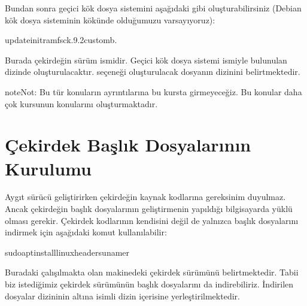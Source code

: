 \documentclass[a4paper,10pt,turkish]{sphinxmanual}
\begin{document}
\sphinxAtStartPar
Bundan sonra geçici kök dosya sistemini aşağıdaki gibi oluşturabilirsiniz (Debian kök dosya sisteminin
kökünde olduğumuzu varsayıyoruz):

\begin{sphinxVerbatim}[commandchars=\\\{\}]
\PYGZdl{}update\PYGZhy{}initramfs\PYGZhy{}c\PYGZhy{}k.9.2\PYGZhy{}custom\PYGZhy{}b.
\end{sphinxVerbatim}

\sphinxAtStartPar
Burada  çekirdeğin sürüm ismidir. Geçici kök dosya sistemi 
ismiyle bulunulan dizinde oluşturulacaktır.  seçeneği oluşturulacak dosyanın dizinini
belirtmektedir.

\begin{sphinxadmonition}{note}{Not:}
\sphinxAtStartPar
Bu tür konuların ayrıntılarına bu kursta girmeyeceğiz. Bu konular daha çok  kursunun konularını oluşturmaktadır.
\end{sphinxadmonition}


\section{Çekirdek Başlık Dosyalarının Kurulumu}
\label{\detokenize{kernelcompilation:cekirdek-baslik-dosyalarinin-kurulumu}}
\sphinxAtStartPar
Aygıt sürücü geliştirirken çekirdeğin kaynak kodlarına gereksinim duyulmaz. Ancak çekirdeğin başlık
dosyalarının geliştirmenin yapıldığı bilgisayarda yüklü olması gerekir. Çekirdek kodlarının kendisini
değil de yalnızca başlık dosyalarını indirmek için aşağıdaki komut kullanılabilir:

\begin{sphinxVerbatim}[commandchars=\\\{\}]
\PYGZdl{}sudoaptinstalllinux\PYGZhy{}headers\PYGZhy{}uname\PYGZhy{}r
\end{sphinxVerbatim}

\sphinxAtStartPar
Buradaki  çalışılmakta olan makinedeki çekirdek sürümünü belirtmektedir. Tabii biz
istediğimiz çekirdek sürümünün başlık dosyalarını da indirebiliriz. İndirilen dosyalar 
dizininin altına  isimli dizin içerisine yerleştirilmektedir.
\end{document}
